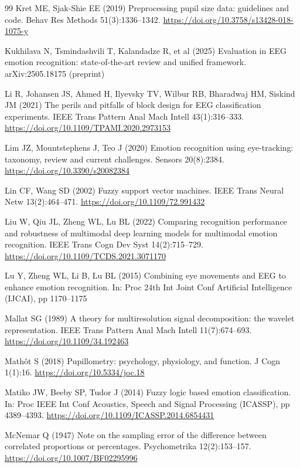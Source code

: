 \documentclass[11pt,a4paper]{article}
\begin{document}
\begin{thebibliography}{99}
 Kret ME, Sjak-Shie EE (2019) Preprocessing pupil size data: guidelines and code. Behav Res Methods 51(3):1336--1342. \url{https://doi.org/10.3758/s13428-018-1075-y}

 Kukhilava N, Tsmindashvili T, Kalandadze R, et al (2025) Evaluation in EEG emotion recognition: state-of-the-art review and unified framework. arXiv:2505.18175 (preprint)

 Li R, Johansen JS, Ahmed H, Ilyevsky TV, Wilbur RB, Bharadwaj HM, Siskind JM (2021) The perils and pitfalls of block design for EEG classification experiments. IEEE Trans Pattern Anal Mach Intell 43(1):316--333. \url{https://doi.org/10.1109/TPAMI.2020.2973153}

 Lim JZ, Mountstephens J, Teo J (2020) Emotion recognition using eye-tracking: taxonomy, review and current challenges. Sensors 20(8):2384. \url{https://doi.org/10.3390/s20082384}

 Lin CF, Wang SD (2002) Fuzzy support vector machines. IEEE Trans Neural Netw 13(2):464--471. \url{https://doi.org/10.1109/72.991432}

 Liu W, Qiu JL, Zheng WL, Lu BL (2022) Comparing recognition performance and robustness of multimodal deep learning models for multimodal emotion recognition. IEEE Trans Cogn Dev Syst 14(2):715--729. \url{https://doi.org/10.1109/TCDS.2021.3071170}

 Lu Y, Zheng WL, Li B, Lu BL (2015) Combining eye movements and EEG to enhance emotion recognition. In: Proc 24th Int Joint Conf Artificial Intelligence (IJCAI), pp 1170--1175

 Mallat SG (1989) A theory for multiresolution signal decomposition: the wavelet representation. IEEE Trans Pattern Anal Mach Intell 11(7):674--693. \url{https://doi.org/10.1109/34.192463}

 Math\^ot S (2018) Pupillometry: psychology, physiology, and function. J Cogn 1(1):16. \url{https://doi.org/10.5334/joc.18}

 Matiko JW, Beeby SP, Tudor J (2014) Fuzzy logic based emotion classification. In: Proc IEEE Int Conf Acoustics, Speech and Signal Processing (ICASSP), pp 4389--4393. \url{https://doi.org/10.1109/ICASSP.2014.6854431}

 McNemar Q (1947) Note on the sampling error of the difference between correlated proportions or percentages. Psychometrika 12(2):153--157. \url{https://doi.org/10.1007/BF02295996}


\end{thebibliography}
\end{document}
